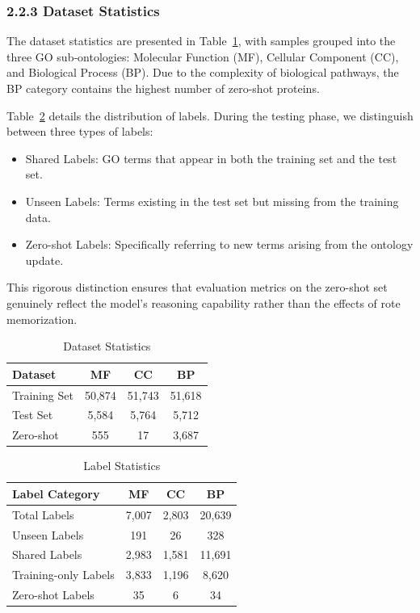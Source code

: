 \documentclass[unnumsec,webpdf,contemporary,large]{oup-authoring-template}%
\theoremstyle{thmstyleone}%
\theoremstyle{thmstyletwo}%
\theoremstyle{thmstylethree}%
\begin{document}
\subsubsection{2.2.3 Dataset Statistics}
The dataset statistics are presented in Table~\ref{tab:dataset_stats}, with samples grouped into the three GO sub‑ontologies: Molecular Function (MF), Cellular Component (CC), and Biological Process (BP). Due to the complexity of biological pathways, the BP category contains the highest number of zero-shot proteins.

Table~\ref{tab:label_stats} details the distribution of labels. During the testing phase, we distinguish between three types of labels:
\begin{itemize}
    \item Shared Labels: GO terms that appear in both the training set and the test set.
    \item Unseen Labels: Terms existing in the test set but missing from the training data.
    \item Zero-shot Labels: Specifically referring to new terms arising from the ontology update.
\end{itemize}
This rigorous distinction ensures that evaluation metrics on the zero-shot set genuinely reflect the model's reasoning capability rather than the effects of rote memorization.

\begin{table}[h]
\centering
\caption{Dataset Statistics}
\label{tab:dataset_stats}
\begin{tabular}{lccc}
\hline
Dataset & MF & CC & BP \\
\hline
Training Set & 50,874 & 51,743 & 51,618 \\
Test Set & 5,584 & 5,764 & 5,712 \\
Zero-shot & 555 & 17 & 3,687 \\
\hline
\end{tabular}
\end{table}

\begin{table}[h]
\centering
\caption{Label Statistics}
\label{tab:label_stats}
\begin{tabular}{lccc}
\hline
Label Category & MF & CC & BP \\
\hline
Total Labels & 7,007 & 2,803 & 20,639 \\
Unseen Labels & 191 & 26 & 328 \\
Shared Labels & 2,983 & 1,581 & 11,691 \\
Training-only Labels & 3,833 & 1,196 & 8,620 \\
Zero-shot Labels & 35 & 6 & 34 \\
\hline
\end{tabular}
\end{table}
\end{document}
